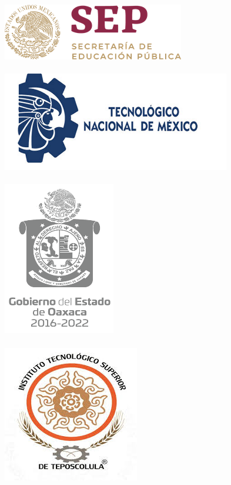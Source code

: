 \begin{figure}[h]
\begin{minipage}[c]{0.3\textwidth} 
\includegraphics[scale=0.63]{sep.png} \\ \vspace{2cm}\\
\includegraphics[scale=1.2]{tecnm.png} \\ \vspace{2cm}\\
\includegraphics[scale=1.2]{gob.png}\\ \vspace{2cm}\\
\includegraphics[scale=0.4]{itste.png} 

\end{minipage}
\end{figure}
